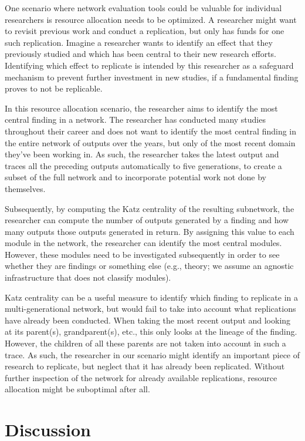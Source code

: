 \documentclass[a5paper]{book}
\begin{document}
One scenario where network evaluation tools could be valuable for
individual researchers is resource allocation needs to be optimized. A
researcher might want to revisit previous work and conduct a
replication, but only has funds for one such replication. Imagine a
researcher wants to identify an effect that they previously studied and
which has been central to their new research efforts. Identifying which
effect to replicate is intended by this researcher as a safeguard
mechanism to prevent further investment in new studies, if a fundamental
finding proves to not be replicable.

In this resource allocation scenario, the researcher aims to identify
the most central finding in a network. The researcher has conducted many
studies throughout their career and does not want to identify the most
central finding in the entire network of outputs over the years, but
only of the most recent domain they've been working in. As such, the
researcher takes the latest output and traces all the preceding outputs
automatically to five generations, to create a subset of the full
network and to incorporate potential work not done by themselves.

Subsequently, by computing the Katz centrality of the resulting
subnetwork, the researcher can compute the number of outputs generated
by a finding and how many outputs those outputs generated in return. By
assigning this value to each module in the network, the researcher can
identify the most central modules. However, these modules need to be
investigated subsequently in order to see whether they are findings or
something else (e.g., theory; we assume an agnostic infrastructure that
does not classify modules).

Katz centrality can be a useful measure to identify which finding to
replicate in a multi-generational network, but would fail to take into
account what replications have already been conducted. When taking the
most recent output and looking at its parent(s), grandparent(s), etc.,
this only looks at the lineage of the finding. However, the children of
all these parents are not taken into account in such a trace. As such,
the researcher in our scenario might identify an important piece of
research to replicate, but neglect that it has already been replicated.
Without further inspection of the network for already available
replications, resource allocation might be suboptimal after all.

\section{Discussion}\label{discussion-7}
\end{document}
